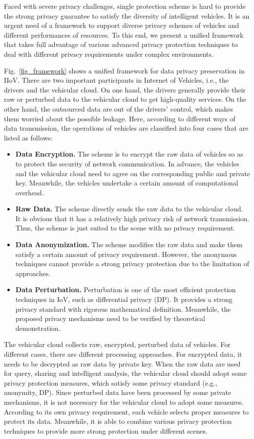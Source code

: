 \documentclass[journal,transmag,11pt]{IEEEtran}
\begin{document}
Faced with severe privacy challenges, single protection scheme is hard to provide the strong privacy guarantee to satisfy the diversity of intelligent vehicles. It is an urgent need of a framework to support diverse privacy schemes of vehicles and different performances of resources. To this end, we present a unified framework that takes full advantage of various advanced privacy protection techniques to deal with different privacy requirements under complex environments.

Fig.~\ref{fig_framework} shows a unified framework for data privacy preservation in IIoV. There are two important participants in Internet of Vehicles, i.e., the drivers and the vehicular cloud. On one hand, the drivers generally provide their raw or perturbed data to the vehicular cloud to get high-quality services. On the other hand, the outsourced data are out of the drivers' control, which makes them worried about the possible leakage. Here, according to different ways of data transmission, the operations of vehicles are classified into four cases that are listed as follows:
\begin{itemize}
	\item \textbf{Data Encryption.} The scheme is to encrypt the raw data of vehicles so as to protect the security of network communication. In advance, the vehicles and the vehicular cloud need to agree on the corresponding public and private key. Meanwhile, the vehicles undertake a certain amount of computational overhead.
	\item \textbf{Raw Data.} The scheme directly sends the raw data to the vehicular cloud. It is obvious that it has a relatively high privacy risk of network transmission. Thus, the scheme is just suited to the scene with no privacy requirement. 
	\item \textbf{Data Anonymization.} The scheme modifies the raw data and make them satisfy a certain amount of privacy requirement. However, the anonymous techniques cannot provide a strong privacy protection due to the limitation of approaches.
	\item \textbf{Data Perturbation.} Perturbation is one of the most efficient protection techniques in IoV, such as differential privacy (DP). It provides a strong privacy standard with rigorous mathematical definition. Meanwhile, the proposed privacy mechanisms need to be verified by theoretical demonstration.
\end{itemize} 	

The vehicular cloud collects raw, encrypted, perturbed data of vehicles. For different cases, there are different processing approaches. For encrypted data, it needs to be decrypted as raw data by private key. When the raw data are used for query, sharing and intelligent analysis, the vehicular cloud should adopt some privacy protection measures, which satisfy some privacy standard (e.g., anonymity, DP). Since perturbed data have been processed by some private mechanisms, it is not necessary for the vehicular cloud to adopt some measures. According to its own privacy requirement, each vehicle selects proper measures to protect its data. Meanwhile,  it is able to combine various privacy protection techniques to provide more strong protection under different scenes.
\end{document}
